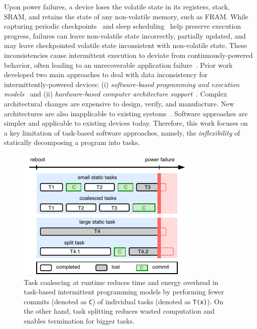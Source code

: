 Upon power failures, a device loses the volatile
state in its registers, stack, SRAM, and retains the state of any non-volatile
memory, such as FRAM. While capturing periodic
checkpoints~\cite{mementos,quickrecall} and sleep
scheduling~\cite{dewdrop,hibernus,hibernusplusplus} help preserve execution
progress, failures can leave non-volatile state incorrectly, partially updated,
and may leave checkpointed volatile state inconsistent with non-volatile state.
These inconsistencies cause intermittent execution to deviate from
continuously-powered behavior, often leading to an unrecoverable
application failure~\cite{dino,edb}. Prior work developed two main approaches to deal with data inconsistency for
intermittently-powered devices: (i) \emph{software-based programming and
execution models}~\cite{dino,ratchet,chain,alpaca} and (ii)
\emph{hardware-based computer architecture
support}~\cite{hicks_isca_2017,idetic,nvp}. Complex architectural changes are
expensive to design, verify, and manufacture. New architectures are also
inapplicable to existing systems~\cite{hicks_isca_2017,nvp}. Software
approaches are simpler and applicable to existing devices today. Therefore, this work focuses on a key limitation of task-based software approaches, namely, the {\em inflexibility} of statically decomposing a program into tasks.
%
\begin{figure}
    \centering
    \includegraphics[width=0.7\columnwidth]{figures/intro-figure-vert.pdf}
    \caption{Task coalescing at runtime reduces time and energy overhead in task-based intermittent programming models by performing fewer commits (denoted as \texttt{C}) of individual tasks (denoted as \texttt{T(x)}). On the other hand, task splitting reduces wasted computation and enables termination for bigger tasks.}
    \label{fig:coalesce}
\end{figure}
%

